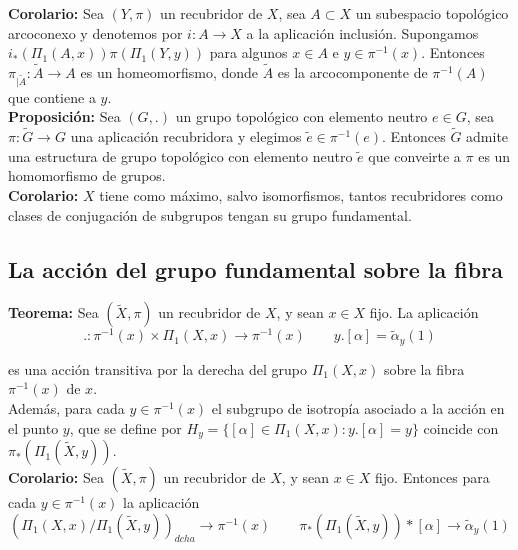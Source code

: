 \documentclass{article}
\begin{document}
\textbf{Corolario:} Sea $(Y,\pi)$ un recubridor de $X$, sea $A\subset X$ un subespacio topológico arcoconexo y denotemos por $i:A\rightarrow X$ a la aplicación inclusión. Supongamos $i_*(\Pi_1(A,x))\pi(\Pi_1(Y,y))$ para algunos $x\in A$ e $y\in \pi^{-1}(x)$. Entonces $\pi_{|\tilde{A}}:\tilde{A}\rightarrow A$ es un homeomorfismo, donde $\tilde{A}$ es la arcocomponente de $\pi^{-1}(A)$ que contiene a $y$.\\

\textbf{Proposición:} Sea $(G,.)$ un grupo topológico con elemento neutro $e\in G$, sea $\pi:\tilde{G}\rightarrow G$ una aplicación recubridora y elegimos $\tilde{e}\in \pi^{-1}(e)$. Entonces $\tilde{G}$ admite una estructura de grupo topológico con elemento neutro $\tilde{e}$ que conveirte a $\pi$ es un homomorfismo de grupos. \\

\textbf{Corolario:} $X$ tiene como máximo, salvo isomorfismos, tantos recubridores como clases de conjugación de subgrupos tengan su grupo fundamental.\\

\subsection{La acción del grupo fundamental sobre la fibra}
\textbf{Teorema:} Sea $(\tilde{X},\pi)$ un recubridor de $X$, y sean $x\in X$ fijo. La aplicación
\begin{equation*}
.:\pi^{-1}(x)\times \Pi_1(X,x)\rightarrow \pi^{-1}(x)\qquad y.[\alpha]=\tilde{\alpha}_y(1)
\end{equation*}

es una acción transitiva por la derecha del grupo $\Pi_1(X,x)$ sobre la fibra $\pi^{-1}(x)$ de $x$.\\

Además, para cada $y\in \pi^{-1}(x)$ el subgrupo de isotropía asociado a la acción en el punto $y$, que se define por $H_y=\{[\alpha]\in\Pi_1(X,x):y.[\alpha]=y\}$ coincide con $\pi_*(\Pi_1(\tilde{X},y))$.\\

\textbf{Corolario:} Sea $(\tilde{X},\pi)$ un recubridor de $X$, y sean $x\in X$ fijo. Entonces para cada $y\in \pi^{-1}(x)$ la aplicación 
\begin{equation*}
\left( \Pi_1(X,x)/\Pi_1(\tilde{X},y)\right)_{dcha}\rightarrow \pi^{-1}(x)\qquad \pi_*(\Pi_1(\tilde{X},y))*[\alpha]\rightarrow \tilde{\alpha}_y(1)
\end{equation*}
\end{document}
